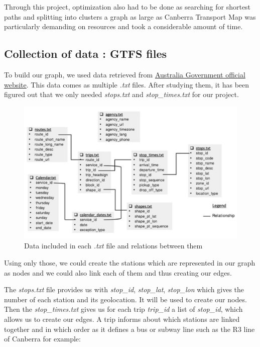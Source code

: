 \documentclass{article}
\begin{document}
	Through this project, optimization also had to be done as searching for shortest paths and splitting into clusters a graph as large as Canberra Transport Map was particularly demanding on resources and took a considerable amount of time.
	
\subsection{Collection of data : GTFS files}
	
	To build our graph, we used data retrieved from \href{https://www.transport.act.gov.au/contact-us/information-for-developers}{Australia Government official website}. This data comes as multiple \textit{.txt} files. After studying them, it has been figured out that we only needed \textit{stops.txt} and \textit{stop\_times.txt} for our project.
	
\begin{figure}[h]
\begin{center}
	\includegraphics[scale=0.8]{assets/data}
\end{center} 
\caption{Data included in each \textit{.txt} file and relations between them}
\end{figure} 


	Using only those, we could create the stations which are represented in our graph as nodes and we could also link each of them and thus creating our edges.
	
\newpage
	
	The \textit{stops.txt} file provides us with \textit{stop\_id}, \textit{stop\_lat}, \textit{stop\_lon} which gives the number of each station and its geolocation. It will be used to create our nodes. Then the \textit{stop\_times.txt} gives us for each trip \textit{trip\_id} a list of \textit{stop\_id}, which allows us to create our edges. A trip informs about which stations are linked together and in which order as it defines a bus or subway line such as the R3 line of Canberra for example:
	
\end{document}
